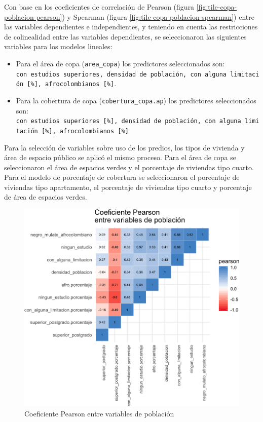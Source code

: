 \documentclass[12pt,a4paper,oneside, openany]{book}
\theoremstyle{definition}
\theoremstyle{definition}
\theoremstyle{definition}
\theoremstyle{remark}
\begin{document}
Con base en los coeficientes de correlación de Pearson (figura
\ref{fig:tile-copa-poblacion-pearson}) y Spearman (figura
\ref{fig:tile-copa-poblacion-spearman}) entre las variables dependientes
e independientes, y teniendo en cuenta las restricciones de colinealidad
entre las variables dependientes, se seleccionaron las siguientes
variables para los modelos lineales:

\begin{itemize}
\item
  Para el área de copa (\texttt{area\_copa}) los predictores
  seleccionados son:
  \texttt{con\ estudios\ superiores,\ densidad\ de\ población,\ con\ alguna\ limitación\ {[}\%{]},\ afrocolombianos\ {[}\%{]}}.
\item
  Para la cobertura de copa (\texttt{cobertura\_copa.ap}) los
  predictores seleccionados son:
  \texttt{con\ estudios\ superiores\ {[}\%{]},\ densidad\ de\ población,\ con\ alguna\ limitación\ {[}\%{]},\ afrocolombianos\ {[}\%{]}}
\end{itemize}

Para la selección de variables sobre uso de los predios, los tipos de
vivienda y área de espacio público se aplicó el mismo proceso. Para el
área de copa se seleccionaron el área de espacios verdes y el porcentaje
de viviendas tipo cuarto. Para el modelo de porcentaje de cobertura se
seleccionaron el porcentaje de viviendas tipo apartamento, el porcentaje
de viviendas tipo cuarto y porcentaje de área de espacios verdes.

\begin{figure}[H]

{\centering \includegraphics[width=1\linewidth]{tesis-unigis_files/figure-latex/tile-poblacion-pearson-1} 

}

\caption{Coeficiente Pearson entre variables de población}\label{fig:tile-poblacion-pearson}
\end{figure}
\end{document}
